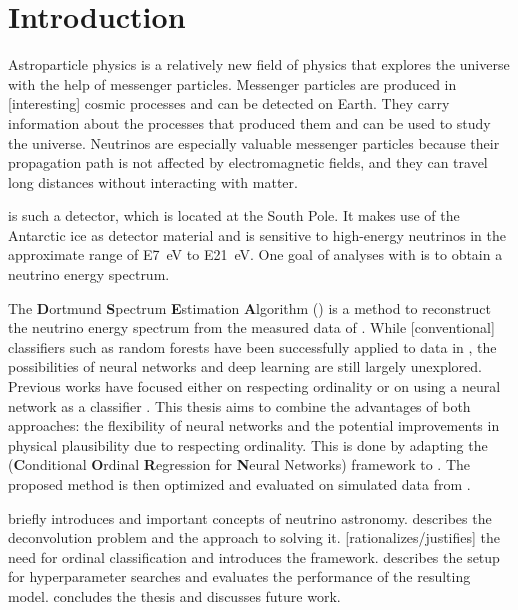 \chapter{Introduction}
Astroparticle physics is a relatively new field of physics
  that explores the universe
    with the help of messenger particles.
Messenger particles are produced in [interesting] cosmic processes
  and can be detected on Earth.
  They carry information about the processes that produced them
  and can be used to study the universe.
Neutrinos are especially valuable messenger particles
  because their propagation path is not affected by electromagnetic fields,
  and they can travel long distances without interacting with matter.


\icecube{} is such a detector,
  which is located at the South Pole.
It makes use of the Antarctic ice as detector material
  and is sensitive to high-energy neutrinos
    in the approximate range of \SI{E7}{\electronvolt} to \SI{E21}{\electronvolt}.
%
One goal of analyses with \icecube{} is
  to obtain a neutrino energy spectrum.

The \textbf{D}ortmund \textbf{S}pectrum \textbf{E}stimation \textbf{A}lgorithm (\dsea{}) \cite{dsea_unification}
is a method to reconstruct the neutrino energy spectrum
  from the measured data of \icecube{}.
While [conventional] classifiers
  such as random forests
have been successfully applied to \icecube{} data in \dsea{},
the possibilities of neural networks and deep learning are still largely unexplored. %
%
Previous works
have focused either
  on respecting ordinality \cite{dsea_jan} %
  or on using a neural network as a classifier \cite{dsea_samuel}.
This thesis aims to combine the advantages of both approaches:
  the flexibility of neural networks
  and the potential improvements in physical plausibility
    due to respecting ordinality.
This is done by adapting the
\corn{} (\textbf{C}onditional \textbf{O}rdinal \textbf{R}egression for \textbf{N}eural Networks) \cite{corn} framework
to \dsea{}.
The proposed method is then optimized and evaluated
  on simulated data from \icecube{}.

 briefly introduces \icecube{} and important concepts of neutrino astronomy.
 describes the deconvolution problem and the \dsea{} approach to solving it.
 [rationalizes/justifies] the need for ordinal classification and introduces the \corn{} framework.
 describes the setup for hyperparameter searches and evaluates the performance of the resulting model. %
 concludes the thesis and discusses future work.
